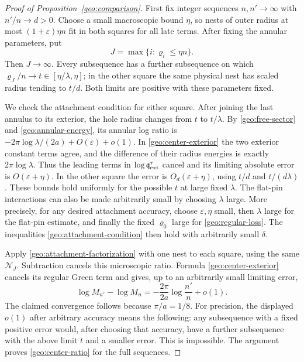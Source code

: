 \begin{proof}[Proof of Proposition~\ref{geo:comparison}]
First fix integer sequences \(n,n'\to\infty\) with \(n'/n\to d>0\).
Choose a small macroscopic bound \(\eta\), so nests of outer radius at
most \((1+\varepsilon)\eta n\) fit in both squares for all late terms.
After fixing the annular parameters, put
\[
              J=\max\{i:\varrho_i\le\eta n\}.
\]
Then \(J\to\infty\).  Every subsequence has a further subsequence on
which \(\varrho_J/n\to t\in[\eta/\lambda,\eta]\); in the other
square the same physical nest has scaled radius tending to \(t/d\).
Both limits are positive with these parameters fixed.

We check the attachment condition for either square.  After joining
the last annulus to its exterior, the hole radius changes from \(t\)
to \(t/\lambda\).  By \eqref{geo:free-sector} and
\eqref{geo:annular-energy}, its annular log ratio is
\(-2\pi\log\lambda/(2a)+O(\varepsilon)+o(1)\).  In
\eqref{geo:center-exterior} the two exterior constant terms agree,
and the difference of their radius energies is exactly
\(2\pi\log\lambda\).  Thus the leading terms in
\(\log\mathfrak q^\tau_{\rm ext}\) cancel and its limiting absolute error is
\(O(\varepsilon+\eta)\).  In the other square the error is
\(O_d(\varepsilon+\eta)\), using \(t/d\) and \(t/(d\lambda)\).
These bounds hold uniformly for the possible \(t\) at large fixed
\(\lambda\).  The flat-pin interactions can also be made arbitrarily
small by choosing \(\lambda\) large.  More precisely, for any desired
attachment accuracy, choose \(\varepsilon,\eta\) small, then
\(\lambda\) large for the flat-pin estimate, and finally the fixed
\(\varrho_0\) large for \eqref{geo:regular-loss}.  The inequalities
\eqref{geo:attachment-condition} then hold with arbitrarily small
\(\delta\).

Apply \eqref{geo:attachment-factorization} with one nest to each
square, using the same \(\mathcal N_J\).  Subtraction cancels this
microscopic ratio.  Formula \eqref{geo:center-exterior} cancels its
regular Green term and gives, up to an arbitrarily small limiting error,
\[
 \log M_{n'}-\log M_n
        =-\frac{2\pi}{2a}\log\frac{n'}n+o(1).
\]
The claimed convergence follows because \(\pi/a=1/8\).
For precision, the displayed \(o(1)\) after arbitrary accuracy means
the following: any subsequence with a fixed positive error would,
after choosing that accuracy, have a further subsequence with the
above limit \(t\) and a smaller error.  This is impossible.  The
argument proves \eqref{geo:center-ratio} for the full sequences.


\end{proof}
